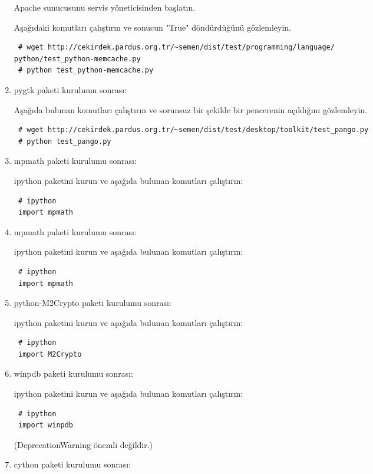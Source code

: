 \documentclass[a4paper,10pt]{article}
\begin{document}
\begin{enumerate}
Apache sunucusunu servis yöneticisinden başlatın.

Aşağıdaki komutları çalıştırın ve sonucun "True" döndürdüğünü gözlemleyin.
\begin{verbatim}
 # wget http://cekirdek.pardus.org.tr/~semen/dist/test/programming/language/
python/test_python-memcache.py
 # python test_python-memcache.py
\end{verbatim}

\item pygtk paketi kurulumu sonrası: 

Aşağıda bulunan komutları çalıştırın ve sorunsuz bir şekilde bir pencerenin açıldığını gözlemleyin.

\begin{verbatim}
 # wget http://cekirdek.pardus.org.tr/~semen/dist/test/desktop/toolkit/test_pango.py
 # python test_pango.py
\end{verbatim}

\item mpmath paketi kurulumu sonrası:  

ipython paketini kurun ve aşağıda bulunan komutları çalıştırın:
\begin{verbatim}
 # ipython
 import mpmath
\end{verbatim}

\item mpmath paketi kurulumu sonrası:  

ipython paketini kurun ve aşağıda bulunan komutları çalıştırın:
\begin{verbatim}
 # ipython
 import mpmath
\end{verbatim}

\item python-M2Crypto paketi kurulumu sonrası:  

ipython paketini kurun ve aşağıda bulunan komutları çalıştırın:
\begin{verbatim}
 # ipython
 import M2Crypto
\end{verbatim}

\item winpdb paketi kurulumu sonrası:  

ipython paketini kurun ve aşağıda bulunan komutları çalıştırın:
\begin{verbatim}
 # ipython
 import winpdb
\end{verbatim}
(DeprecationWarning önemli değildir.)

\item cython paketi kurulumu sonrası:  


\end{enumerate}
\end{document}
